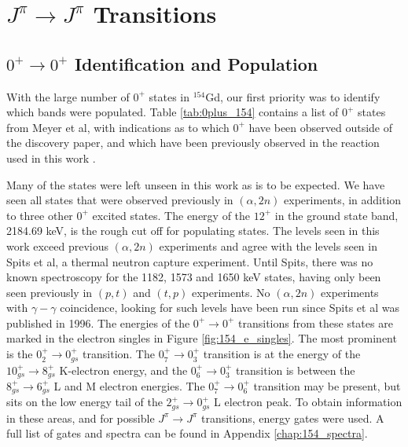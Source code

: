 \section{$J^{\pi}\rightarrow J^{\pi}$ Transitions}
\label{sec:154_J2J}

\subsection{$0^{+}\rightarrow 0^{+}$ Identification and Population}

With the large number of $0^+$ states in $^{154}$Gd, our first priority was to identify which bands were populated. Table \ref{tab:0plus_154} contains a list of $0^+$ states from Meyer et al, with indications as to which $0^+$ have been observed outside of the discovery paper, and which have been previously observed in the reaction used in this work \cite{meyer06:_zeroplus}.



Many of the states were left unseen in this work as is to be expected. We have seen all states that were observed previously in $(\alpha,2n)$ experiments, in addition to three other $0^+$ excited states. The energy of the $12^+$ in the ground state band, 2184.69 keV, is the rough cut off for populating states. The levels seen in this work exceed previous $(\alpha,2n)$ experiments and agree with the levels seen in Spits et al, a thermal neutron capture experiment\citep{spits96:_154gd}. Until Spits, there was no known spectroscopy for the 1182, 1573 and 1650 keV states, having only been seen previously in $(p,t)$ and $(t,p)$ experiments. No $(\alpha,2n)$ experiments with $\gamma-\gamma$ coincidence, looking for such levels have been run since Spits et al was published in 1996. The energies of the $0^+\rightarrow0^+$ transitions from these states are marked in the electron singles in Figure \ref{fig:154_e_singles}. The most prominent is the $0^+_{2}\rightarrow0^+_{gs}$ transition. The $0^+_{7}\rightarrow0^+_{3}$ transition is at the energy of the $10^+_{gs}\rightarrow8^+_{gs}$ K-electron energy, and the $0^+_{6}\rightarrow0^+_{3}$ transition is between the $8^+_{gs}\rightarrow6^+_{gs}$ L and M electron energies. The $0^+_{7}\rightarrow0^+_{6}$ transition may be present, but sits on the low energy tail of the $2^+_{gs}\rightarrow0^+_{gs}$ L electron peak. To obtain information in these areas, and for possible $J^{\pi}\rightarrow J^{\pi}$ transitions, energy gates were used. A full list of gates and spectra can be found in Appendix \ref{chap:154_spectra}.

